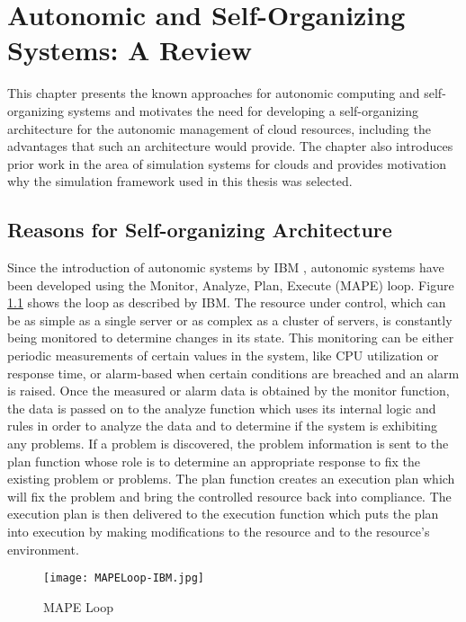 \chapter{Autonomic and Self-Organizing Systems: A Review} %
\label{Chapter_related}

This chapter presents the known approaches for autonomic computing and self-organizing systems and motivates the need for developing a self-organizing architecture for the autonomic management of cloud resources, including the advantages that such an architecture would provide. The chapter also introduces prior work in the area of simulation systems for clouds and provides motivation why the simulation framework used in this thesis was selected.

\section{Reasons for Self-organizing Architecture}

Since the introduction of autonomic systems by IBM \cite{IBM:acblueprint}, autonomic systems have been developed using the Monitor, Analyze, Plan, Execute (MAPE) loop. Figure \ref{fig:MAPELoop-IBM} shows the loop as described by IBM. The resource under control, which can be as simple as a single server or as complex as a cluster of servers, is constantly being monitored to determine changes in its state. This monitoring can be either periodic measurements of certain values in the system, like CPU utilization or response time, or alarm-based when certain conditions are breached and an alarm is raised. Once the measured or alarm data is obtained by the monitor function, the data is passed on to the analyze function which uses its internal logic and rules in order to analyze the data and to determine if the system is exhibiting any problems. If a problem is discovered, the problem information is sent to the plan function whose role is to determine an appropriate response to fix the existing problem or problems. The plan function creates an execution plan which will fix the problem and bring the controlled resource back into compliance. The execution plan is then delivered to the execution function which puts the plan into execution by making modifications to the resource and to the resource's environment.

\begin{figure}
	\centering
		\texttt{[image: MAPELoop-IBM.jpg]}
		\caption{MAPE Loop}
	\label{fig:MAPELoop-IBM}
\end{figure}

